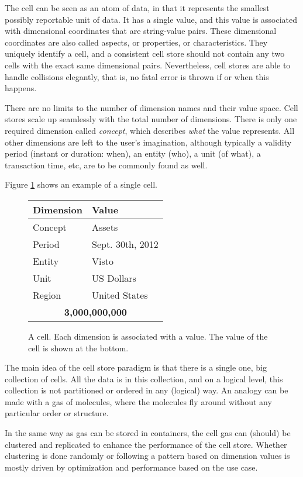 \documentclass{acm_proc_article-sp}
\begin{document}
The cell can be seen as an atom of data, in that it represents the smallest possibly reportable unit of data. It has a single value, and this value is associated with dimensional coordinates that are string-value pairs. These dimensional coordinates are also called aspects, or properties, or characteristics. They uniquely identify a cell, and a consistent cell store should not contain any two cells with the exact same dimensional pairs. Nevertheless, cell stores are able to handle collisions elegantly, that is, no fatal error is thrown if or when this happens.

There are no limits to the number of dimension names and their value space. Cell stores scale up seamlessly with the total number of dimensions. There is only one required dimension called \emph{concept}, which describes \emph{what} the value represents. All other dimensions are left to the user's imagination, although typically a validity period (instant or duration: when), an entity (who), a unit (of what), a transaction time, etc, are to be commonly found as well.

Figure \ref{fig-cell} shows an example of a single cell.

\begin{figure}
\centering
\caption{A cell. Each dimension is associated with a value. The value of the cell is shown at the bottom.}
\label{fig-cell}
\vspace{3mm}
\begin{tabular}{|l|l|}
\hline
Dimension & Value \\
\hline
Concept & Assets \\
Period & Sept. 30th, 2012 \\
Entity & Visto \\
Unit & US Dollars \\
Region & United States \\
\hline
\multicolumn{2}{|c|}{\textbf{3,000,000,000}} \\
\hline
\end{tabular}
\end{figure}

The main idea of the cell store paradigm is that there is a single one, big collection of cells. All the data is in this collection, and on a logical level, this collection is not partitioned or ordered in any (logical) way. An analogy can be made with a gas of molecules, where the molecules fly around without any particular order or structure.

In the same way as gas can be stored in containers, the cell gas can (should) be clustered and replicated to enhance the performance of the cell store. Whether clustering is done randomly or following a pattern based on dimension values is mostly driven by optimization and performance based on the use case.
\end{document}
